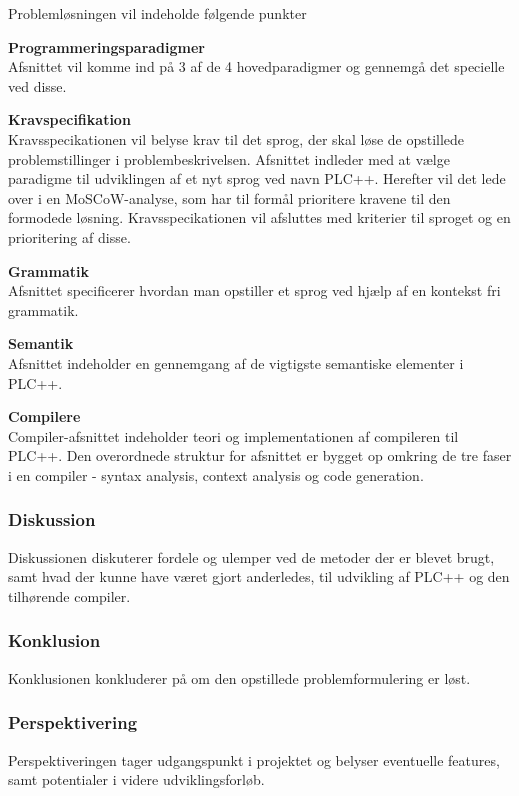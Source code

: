 Problemløsningen vil indeholde følgende punkter
\begin{itemize_small}
    \item \textbf{Programmeringsparadigmer}\\
    Afsnittet vil komme ind på 3 af de 4 hovedparadigmer og gennemgå det specielle ved disse.\\
    \item \textbf{Kravspecifikation}\\
    Kravsspecikationen vil belyse krav til det sprog, der skal løse de opstillede problemstillinger i problembeskrivelsen. Afsnittet indleder med at vælge paradigme til udviklingen af et nyt sprog ved navn PLC++. Herefter vil det lede over i en MoSCoW-analyse, som har til formål prioritere kravene til den formodede løsning. Kravsspecikationen vil afsluttes med kriterier til sproget og en prioritering af disse.\\
    \item \textbf{Grammatik}\\ Afsnittet specificerer hvordan man opstiller et sprog ved hjælp af en kontekst fri grammatik.\\
    \item \textbf{Semantik}\\
    Afsnittet indeholder en gennemgang af de vigtigste semantiske elementer i PLC++.\\
    \item \textbf{Compilere}\\
    Compiler-afsnittet indeholder teori og implementationen af compileren til PLC++. Den overordnede struktur for afsnittet er bygget op omkring de tre faser i en compiler - syntax analysis, context analysis og code generation.\\
\end{itemize_small}

\subsubsection*{Diskussion}
Diskussionen diskuterer fordele og ulemper ved de metoder der er blevet brugt, samt hvad der kunne have været gjort anderledes, til udvikling af PLC++ og den tilhørende compiler. 
\subsubsection*{Konklusion}
Konklusionen konkluderer på om den opstillede problemformulering er løst.

\subsubsection*{Perspektivering}
Perspektiveringen tager udgangspunkt i projektet og belyser eventuelle features, samt potentialer i videre udviklingsforløb.

